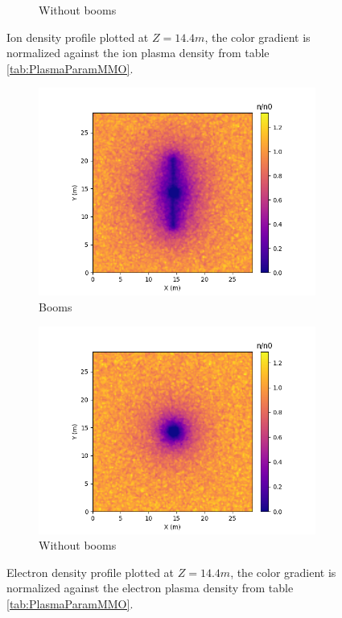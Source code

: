 \begin{center}
\begin{figure}[H]
\begin{subfigure}[b]{0.61\textwidth}
      \caption{Without booms}
      \label{fig:I_noPH_NB}
    \end{subfigure}
  \label{fig:Ions_noPH}
  \caption{Ion density profile plotted at $Z = 14.4 m$, the color gradient is normalized against the ion plasma density from table \ref{tab:PlasmaParamMMO}.}
  \end{figure}
\end{center}

\begin{center}
    \begin{figure}[H]
      \begin{subfigure}[b]{0.61\textwidth}
      \includegraphics[width=\textwidth]{figures/MMO/noPH/WB/E_noPH_WB.png}
      \caption{Booms}
      \label{fig:E_noPH_WB}
    \end{subfigure}
    \begin{subfigure}[b]{0.61\textwidth}
      \includegraphics[width=\textwidth]{figures/MMO/noPH/NB/E_noPH_NB.png}
      \caption{Without booms}
      \label{fig:E_noPH_NB}
    \end{subfigure}
  \label{fig:Elec_noPH}
  \caption{Electron density profile plotted at $Z = 14.4 m$, the color gradient is normalized against the electron plasma density from table \ref{tab:PlasmaParamMMO}.}
  \end{figure}
\end{center}


